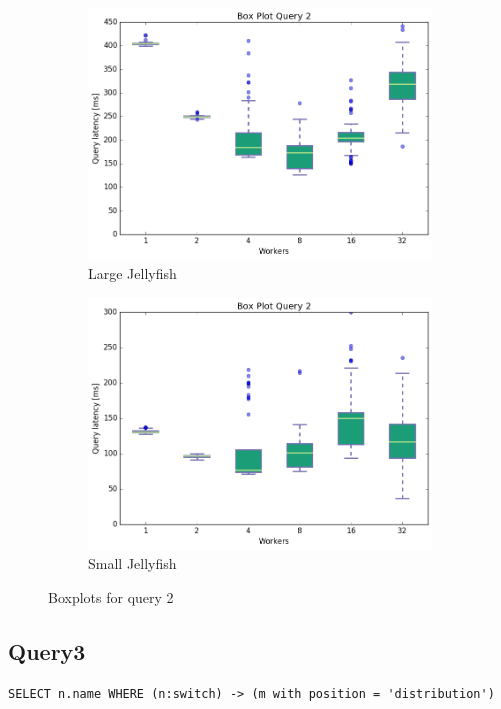 \documentclass[11pt,singlecolumn]{scrartcl}
\begin{document}
\begin{figure}
\begin{subfigure}[b]{0.475\textwidth}
        \centering 
        \includegraphics[width=\textwidth]{boxesjl/q2}
        \caption[]%
        {{\small Large Jellyfish}}    
        \label{fig:mean and std of net34}
    \end{subfigure}
    \quad
    \begin{subfigure}[b]{0.475\textwidth}   
        \centering 
        \includegraphics[width=\textwidth]{boxesjs/q2}
        \caption[]%
        {{\small Small Jellyfish}}    
        \label{fig:mean and std of net44}
    \end{subfigure}
    \caption[  Boxplots for query 2 ]
    {\small Boxplots for query 2} 
    \label{fig:mean and std of nets}
\end{figure}
\clearpage
\subsection{Query3}
\begin{verbatim}
SELECT n.name WHERE (n:switch) -> (m with position = 'distribution')\end{verbatim}
\end{document}
